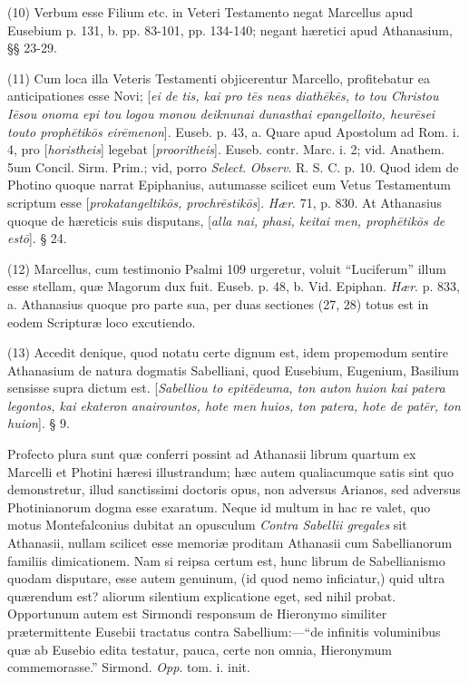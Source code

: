 (10)
Verbum esse Filium etc. in Veteri Testamento negat Marcellus apud
Eusebium p. 131, b. pp. 83-101, pp. 134-140; negant hæretici apud
Athanasium, §§ 23-29.

(11)
Cum loca illa Veteris Testamenti objicerentur Marcello, profitebatur
ea anticipationes esse Novi; [\emph{ei de tis, kai pro t\={e}s neas
diath\={e}k\={e}s, to tou Christou I\={e}sou onoma epi tou
logou monou deiknunai dunasthai epangelloito, heur\={e}sei touto
proph\={e}tik\={o}s eir\={e}menon}]. Euseb. p. 43, a.
Quare apud Apostolum ad Rom. i. 4, pro [\emph{horistheis}] legebat [\emph{prooritheis}].
Euseb. contr. Marc. i. 2; vid. Anathem. 5um Concil.
Sirm. Prim.; vid, porro \emph{Select}. \emph{Observ}. R. S. C. p. 10.
Quod idem de Photino quoque narrat Epiphanius, autumasse scilicet eum
Vetus Testamentum scriptum esse [\emph{prokatangeltik\={o}s, prochr\={e}stik\={o}s}].
\emph{Hær}. 71, p. 830. At Athanasius quoque de hæreticis suis
disputans, [\emph{alla nai, phasi, keitai men, proph\={e}tik\={o}s
de est\={o}}]. § 24.

(12)
Marcellus, cum testimonio Psalmi 109 urgeretur, voluit ``Luciferum''
illum esse stellam, quæ Magorum dux fuit. Euseb. p. 48, b. Vid.
Epiphan. \emph{Hær}. p. 833, a. Athanasius quoque pro parte sua, per
duas sectiones (27, 28) totus est in eodem Scripturæ loco excutiendo.

(13)
Accedit denique, quod notatu certe dignum est, idem propemodum sentire
Athanasium de natura dogmatis Sabelliani, quod Eusebium, Eugenium,
Basilium sensisse supra dictum est. [\emph{Sabelliou to epit\={e}deuma,
ton auton huion kai patera legontos, kai ekateron anairountos, hote
men huios, ton patera, hote de pat\={e}r, ton huion}].
§ 9.

Profecto
plura sunt quæ conferri possint ad Athanasii librum quartum ex
Marcelli et Photini hæresi illustrandum; hæc autem qualiacumque
satis sint quo demonstretur, illud sanctissimi doctoris opus, non
adversus Arianos, sed adversus Photinianorum dogma esse exaratum. Neque id multum in hac re valet, quo motus Montefalconius dubitat an
opusculum \emph{Contra Sabellii gregales} sit Athanasii, nullam
scilicet esse memoriæ proditam Athanasii cum Sabellianorum familiis
dimicationem. Nam si reipsa certum est, hunc librum de Sabellianismo
quodam disputare, esse autem genuinum, (id quod nemo inficiatur,) quid
ultra quærendum est? aliorum silentium explicatione eget, sed nihil
probat. Opportunum autem est Sirmondi responsum de Hieronymo similiter
prætermittente Eusebii tractatus contra Sabellium:—``de infinitis
voluminibus quæ ab Eusebio edita testatur, pauca, certe non omnia,
Hieronymum commemorasse.'' Sirmond. \emph{Opp}. tom. i. init.

